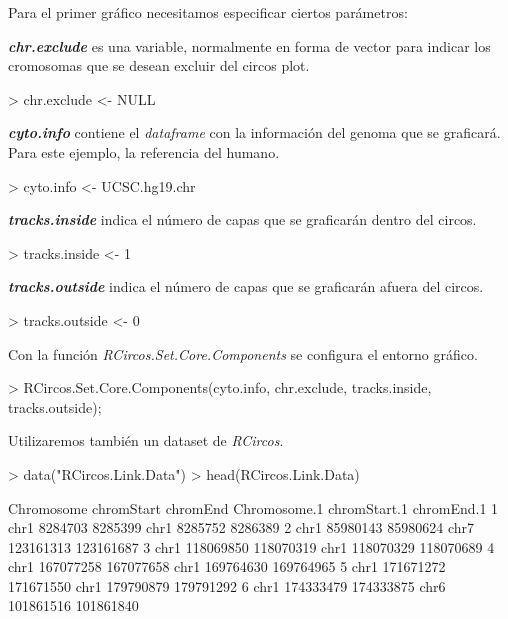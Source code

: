 \documentclass[a4paper,spanish]{article}
\begin{document}
Para el primer gráfico necesitamos especificar ciertos parámetros:

\textit{\textbf{chr.exclude}} es una variable, normalmente en forma de vector para indicar los cromosomas que se desean excluir del circos plot. 

\begin{Schunk}
\begin{Sinput}
> chr.exclude <- NULL
\end{Sinput}
\end{Schunk}

\textit{\textbf{cyto.info}} contiene el \textit{dataframe} con la información del genoma que se graficará. Para este ejemplo, la referencia del humano.

\begin{Schunk}
\begin{Sinput}
> cyto.info <- UCSC.hg19.chr
\end{Sinput}
\end{Schunk}

\textit{\textbf{tracks.inside}} indica el número de capas que se graficarán dentro del circos. 

\begin{Schunk}
\begin{Sinput}
> tracks.inside <- 1
\end{Sinput}
\end{Schunk}

\textit{\textbf{tracks.outside}} indica el número de capas que se graficarán afuera del circos.

\begin{Schunk}
\begin{Sinput}
> tracks.outside <- 0
\end{Sinput}
\end{Schunk}

Con la función \textit{RCircos.Set.Core.Components} se configura el entorno gráfico.

\begin{Schunk}
\begin{Sinput}
> RCircos.Set.Core.Components(cyto.info, chr.exclude, tracks.inside, tracks.outside);
\end{Sinput}
\end{Schunk}

Utilizaremos también un dataset de \textit{RCircos}.

\begin{Schunk}
\begin{Sinput}
> data("RCircos.Link.Data")
> head(RCircos.Link.Data)
\end{Sinput}
\begin{Soutput}
  Chromosome chromStart  chromEnd Chromosome.1 chromStart.1 chromEnd.1
1       chr1    8284703   8285399         chr1      8285752    8286389
2       chr1   85980143  85980624         chr7    123161313  123161687
3       chr1  118069850 118070319         chr1    118070329  118070689
4       chr1  167077258 167077658         chr1    169764630  169764965
5       chr1  171671272 171671550         chr1    179790879  179791292
6       chr1  174333479 174333875         chr6    101861516  101861840
\end{Soutput}
\end{Schunk}
\end{document}
